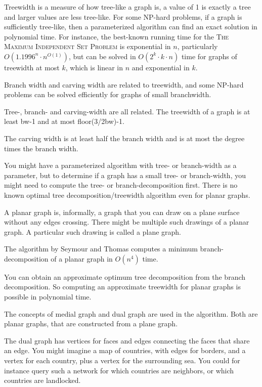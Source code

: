 \documentclass{article}
\begin{document}
	Treewidth is a measure of how tree-like a graph is, a value of 1 is exactly a tree and larger values are less tree-like. For some NP-hard problems, if a graph is sufficiently tree-like, then a parameterized algorithm can find an exact solution in polynomial time. For instance, the best-known running time for the \textsc{The Maximum Independent Set Problem} is exponential in $n$, particularly $O(1.1996^n \cdot n^{O(1)})$\cite{XN17}, but can be solved in $O(2^k \cdot k \cdot n)$ time for graphs of treewidth at most $k$, which is linear in $n$ and exponential in $k$.

	Branch width and carving width are related to treewidth, and some NP-hard problems can be solved efficiently for graphs of small branchwidth.\cite{CNP+11}

	Tree-, branch- and carving-width are all related. The treewidth of a graph is at least bw-1 and at most floor(3/2bw)-1.\cite{RS91}

	The carving width is at least half the branch width and is at most the degree times the branch width.\cite{ED18}

	You might have a parameterized algorithm with tree- or branch-width as a parameter, but to determine if a graph has a small tree- or branch-width, you might need to compute the tree- or branch-decomposition first. There is no known optimal tree decomposition/treewidth algorithm even for planar graphs.

	A planar graph is, informally, a graph that you can draw on a plane surface without any edges crossing. There might be multiple such drawings of a planar graph. A particular such drawing is called a plane graph.
	
	The algorithm by Seymour and Thomas\cite{ST93} computes a minimum branch-decomposition of a planar graph in $O(n^4)$ time.

	You can obtain an approximate optimum tree decomposition from the branch decomposition. So computing an approximate treewidth for planar graphs is possible in polynomial time.

	The concepts of medial graph and dual graph are used in the algorithm. Both are planar graphs, that are constructed from a plane graph.
	
	The dual graph has vertices for faces and edges connecting the faces that share an edge. You might imagine a map of countries, with edges for borders, and a vertex for each country, plus a vertex for the surrounding sea. You could for instance query such a network for which countries are neighbors, or which countries are landlocked.
\end{document}
